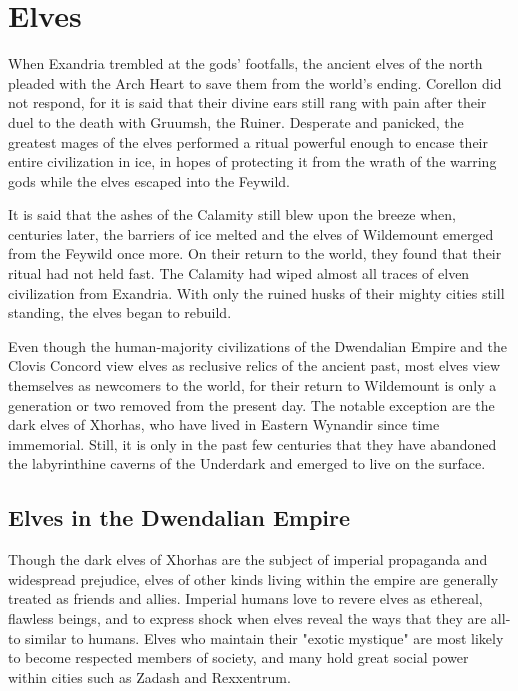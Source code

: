\documentclass[10pt,a4paper,twoside,bg=print,twocolumn,openany,nodeprecatedcode]{dndbook}
\begin{document}
\section{Elves}
When Exandria trembled at the gods' footfalls, the ancient elves of the north pleaded with the Arch Heart to save them from the world's ending. Corellon did not respond, for it is said that their divine ears still rang with pain after their duel to the death with Gruumsh, the Ruiner. Desperate and panicked, the greatest mages of the elves performed a ritual powerful enough to encase their entire civilization in ice, in hopes of protecting it from the wrath of the warring gods while the elves escaped into the Feywild.

It is said that the ashes of the Calamity still blew upon the breeze when, centuries later, the barriers of ice melted and the elves of Wildemount emerged from the Feywild once more. On their return to the world, they found that their ritual had not held fast. The Calamity had wiped almost all traces of elven civilization from Exandria. With only the ruined husks of their mighty cities still standing, the elves began to rebuild.

Even though the human-majority civilizations of the Dwendalian Empire and the Clovis Concord view elves as reclusive relics of the ancient past, most elves view themselves as newcomers to the world, for their return to Wildemount is only a generation or two removed from the present day. The notable exception are the dark elves of Xhorhas, who have lived in Eastern Wynandir since time immemorial. Still, it is only in the past few centuries that they have abandoned the labyrinthine caverns of the Underdark and emerged to live on the surface.

\subsection{Elves in the Dwendalian Empire}
Though the dark elves of Xhorhas are the subject of imperial propaganda and widespread prejudice, elves of other kinds living within the empire are generally treated as friends and allies. Imperial humans love to revere elves as ethereal, flawless beings, and to express shock when elves reveal the ways that they are all-to similar to humans. Elves who maintain their "exotic mystique" are most likely to become respected members of society, and many hold great social power within cities such as Zadash and Rexxentrum.
\end{document}
